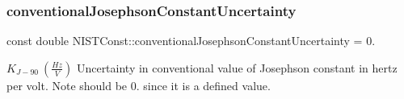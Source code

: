 \subsubsection{\texorpdfstring{conventional\+Josephson\+Constant\+Uncertainty}{conventionalJosephsonConstantUncertainty}}
{\footnotesize\ttfamily const double N\+I\+S\+T\+Const\+::conventional\+Josephson\+Constant\+Uncertainty = 0.}

$K_{J-90} \ (\frac{Hz}{V})$ Uncertainty in conventional value of Josephson constant in hertz per volt. Note should be 0. since it is a defined value. 